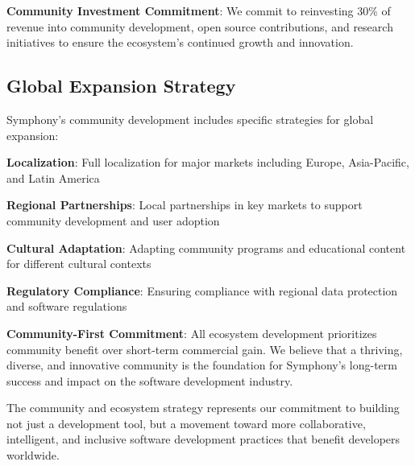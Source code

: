 \textbf{Community Investment Commitment}:
We commit to reinvesting 30\% of revenue into community development, open source contributions, and research initiatives to ensure the ecosystem's continued growth and innovation.

\subsection*{Global Expansion Strategy}

Symphony's community development includes specific strategies for global expansion:

\begin{expandedlist}
    \item \textbf{Localization}: Full localization for major markets including Europe, Asia-Pacific, and Latin America
    \item \textbf{Regional Partnerships}: Local partnerships in key markets to support community development and user adoption
    \item \textbf{Cultural Adaptation}: Adapting community programs and educational content for different cultural contexts
    \item \textbf{Regulatory Compliance}: Ensuring compliance with regional data protection and software regulations
\end{expandedlist}

\begin{alertbox}
\textbf{Community-First Commitment}: All ecosystem development prioritizes community benefit over short-term commercial gain. We believe that a thriving, diverse, and innovative community is the foundation for Symphony's long-term success and impact on the software development industry.
\end{alertbox}

The community and ecosystem strategy represents our commitment to building not just a development tool, but a movement toward more collaborative, intelligent, and inclusive software development practices that benefit developers worldwide.